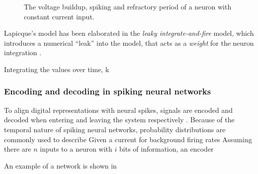 \documentclass[report.tex]{subfiles}
\begin{document}
\begin{figure}
\centering

\caption{The voltage buildup, spiking and refractory period of a neuron with
	 constant current input.}
\label{fig:spiking}
\end{figure}


Lapicque's model has been elaborated in the \textit{leaky
integrate-and-fire} model, which introduces a numerical ``leak''
into the model, that acts as a \textit{weight} for the neuron integration
\cite{Eliasmith2004, Eliasmith2015}.

Integrating the values over time, k


\subsubsection{Encoding and decoding in spiking neural networks}
To align digital representations with neural spikes,
signals are encoded and decoded when entering and leaving the system
respectively \cite{Dayan2001}.
Because of the temporal nature of spiking neural networks, probability
distributions are commonly used to describe 
Given a current for background firing rates
Assuming there are $n$ inputs to a neuron with $i$ bits of information,
an encoder


An example of a network is shown in 
\end{document}
